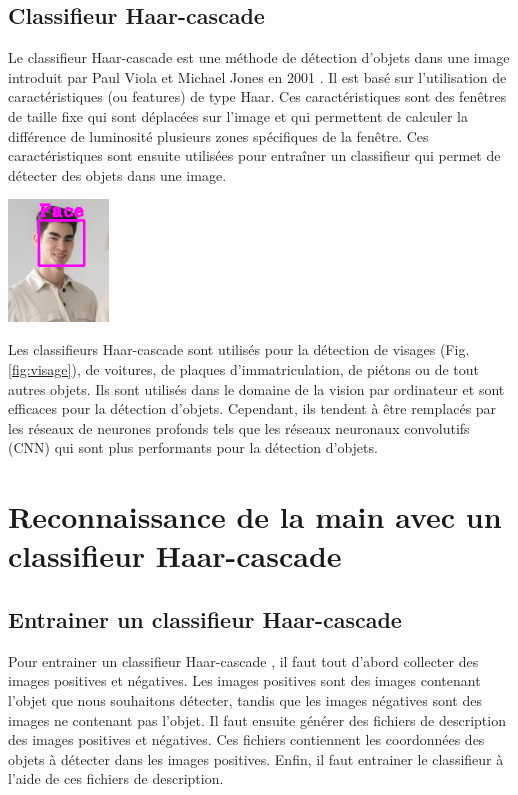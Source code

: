 \documentclass[11pt]{article}
\begin{document}
\subsection{Classifieur Haar-cascade}
Le classifieur Haar-cascade est une méthode de détection d'objets dans une image introduit par Paul Viola et Michael Jones en 2001 \cite{viola_rapid_2001}. Il est basé sur l'utilisation de caractéristiques (ou features) de type Haar. Ces caractéristiques sont des fenêtres de taille fixe qui sont déplacées sur l'image et qui permettent de calculer la différence de luminosité plusieurs zones spécifiques de la fenêtre. Ces caractéristiques sont ensuite utilisées pour entraîner un classifieur qui permet de détecter des objets dans une image. \bigbreak

\begin{center}
    \includegraphics[width=0.2\textwidth]{images/visage.png}
    \label{fig:visage}
\end{center}

Les classifieurs Haar-cascade sont utilisés pour la détection de visages (Fig. \ref{fig:visage}), de voitures, de plaques d'immatriculation, de piétons ou de tout autres objets. Ils sont utilisés dans le domaine de la vision par ordinateur et sont efficaces pour la détection d'objets.
Cependant, ils tendent à être remplacés par les réseaux de neurones profonds tels que les réseaux neuronaux convolutifs (CNN) qui sont plus performants pour la détection d'objets.

\newpage

\section{Reconnaissance de la main avec un classifieur Haar-cascade}
\subsection{Entrainer un classifieur Haar-cascade}
Pour entrainer un classifieur Haar-cascade \cite{mittal_haar_2024}, il faut tout d'abord collecter des images positives et négatives. Les images positives sont des images contenant l'objet que nous souhaitons détecter, tandis que les images négatives sont des images ne contenant pas l'objet. Il faut ensuite générer des fichiers de description des images positives et négatives. Ces fichiers contiennent les coordonnées des objets à détecter dans les images positives. Enfin, il faut entrainer le classifieur à l'aide de ces fichiers de description. \bigbreak
\end{document}
